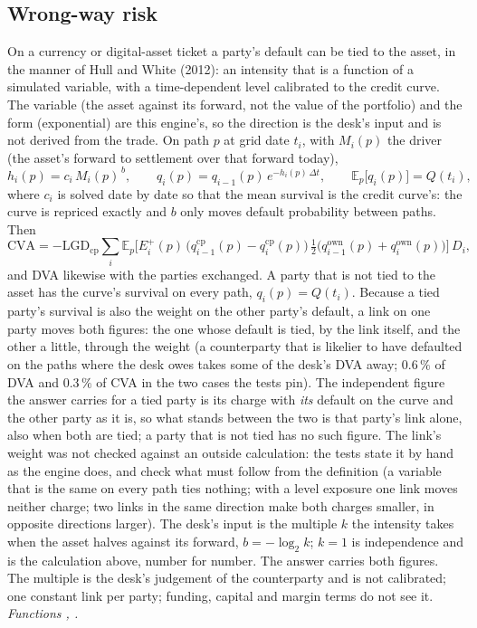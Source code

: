 \documentclass[11pt,a4paper]{article}
\newcommand{\code}[1]{\ifmmode\text{\small\texttt{\detokenize{#1}}}\else{\small\path{#1}}\fi}
\newcommand{\E}{\mathbb{E}}
\let\plainsubsection\subsection
\renewcommand{\subsection}{\needspace{5\baselineskip}\plainsubsection}
\begin{document}
\subsection{Wrong-way risk}
On a currency or digital-asset ticket a party's default can be tied to the asset, in the manner of Hull and White (2012): an intensity that is a function of a simulated variable, with a time-dependent level calibrated to the credit curve. The variable (the asset against its forward, not the value of the portfolio) and the form (exponential) are this engine's, so the direction is the desk's input and is not derived from the trade. On path $p$ at grid date $t_i$, with $M_i(p)$ the driver (the asset's forward to settlement over that forward today),
\begin{equation}
h_i(p) = c_i\,M_i(p)^{\,b},\qquad q_i(p) = q_{i-1}(p)\,e^{-h_i(p)\,\Delta t},\qquad \E_p\big[q_i(p)\big] = Q(t_i),
\end{equation}
where $c_i$ is solved date by date so that the mean survival is the credit curve's: the curve is repriced exactly and $b$ only moves default probability between paths. Then
\begin{equation}
\mathrm{CVA} = -\mathrm{LGD}_{\mathrm{cp}}\sum_i \E_p\big[E^+_i(p)\,\big(q^{\mathrm{cp}}_{i-1}(p)-q^{\mathrm{cp}}_i(p)\big)\,\tfrac12\big(q^{\mathrm{own}}_{i-1}(p)+q^{\mathrm{own}}_i(p)\big)\big]\,D_i ,
\end{equation}
and DVA likewise with the parties exchanged. A party that is not tied to the asset has the curve's survival on every path, $q_i(p)=Q(t_i)$. Because a tied party's survival is also the weight on the other party's default, a link on one party moves both figures: the one whose default is tied, by the link itself, and the other a little, through the weight (a counterparty that is likelier to have defaulted on the paths where the desk owes takes some of the desk's DVA away; $0.6\,\%$ of DVA and $0.3\,\%$ of CVA in the two cases the tests pin). The independent figure the answer carries for a tied party is its charge with \emph{its} default on the curve and the other party as it is, so what stands between the two is that party's link alone, also when both are tied; a party that is not tied has no such figure. The link's weight was not checked against an outside calculation: the tests state it by hand as the engine does, and check what must follow from the definition (a variable that is the same on every path ties nothing; with a level exposure one link moves neither charge; two links in the same direction make both charges smaller, in opposite directions larger). The desk's input is the multiple $k$ the intensity takes when the asset halves against its forward, $b=-\log_2 k$; $k=1$ is independence and is the calculation above, number for number. The answer carries both figures. The multiple is the desk's judgement of the counterparty and is not calibrated; one constant link per party; funding, capital and margin terms do not see it. \emph{Functions \code{hazard_beta}, \code{path_survival}.}
\end{document}
